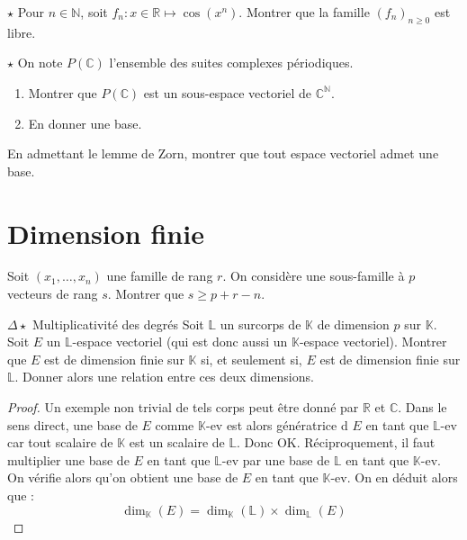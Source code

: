 \documentclass[french,a4paper]{article}
\newcommand{\N}{\mathbb{N}}
\newcommand{\R}{\mathbb{R}}
\newcommand{\C}{\mathbb{C}}
\newcommand{\K}{\mathbb{K}}
\renewcommand{\L}{\mathbb{L}}
\theoremstyle{plain}
\theoremstyle{definition}
\theoremstyle{remark}
\begin{document}
\begin{ex}[Moulin.18]{$\star$}
	Pour $n\in\N$, soit $f_n:x\in\R\mapsto\cos(x^n)$. Montrer que la famille $(f_n)_{n\geqslant 0}$ est libre.
\end{ex}

\begin{ex}[Moulin.19]{$\star$}
	On note $P(\C)$ l'ensemble des suites complexes périodiques.
	\begin{enumerate}
		\item Montrer que $P(\C)$ est un sous-espace vectoriel de $\C^\N$.
		\item En donner une base.
	\end{enumerate}
\end{ex}

\begin{ex}
	En admettant le lemme de Zorn, montrer que tout espace vectoriel admet une base.
\end{ex}

\section{Dimension finie}

\begin{ex}[Moulin.20]{}
	Soit $(x_1,\ldots,x_n)$ une famille de rang $r$. On considère une sous-famille à $p$ vecteurs de rang $s$. Montrer que $s\geqslant p+r-n$.
\end{ex}

\begin{ex}[Moulin.21]{$\Delta\star$ Multiplicativité des degrés}
	Soit $\L$ un surcorps de $\K$ de dimension $p$ sur $\K$. Soit $E$ un $\L$-espace vectoriel (qui est donc aussi un $\K$-espace vectoriel). Montrer que $E$ est de dimension finie sur $\K$ si, et seulement si, $E$ est de dimension finie sur $\L$. Donner alors une relation entre ces deux dimensions.
\end{ex}
\begin{proof}
	Un exemple non trivial de tels corps peut être donné par $\R$ et $\C$. Dans le sens direct, une base de $E$ comme $\K$-ev est alors génératrice d $E$ en tant que $\L$-ev car tout scalaire de $\K$ est un scalaire de $\L$. Donc OK. Réciproquement, il faut multiplier une base de $E$ en tant que $\L$-ev par une base de $\L$ en tant que $\K$-ev. On vérifie alors qu'on obtient une base de $E$ en tant que $\K$-ev. On en déduit alors que : $$\dim_\K(E)=\dim_\K(\L)\times\dim_\L(E)$$
\end{proof}
\end{document}
